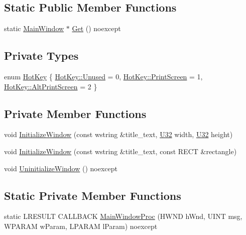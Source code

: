 \subsection*{Static Public Member Functions}
\begin{DoxyCompactItemize}
\item 
static \hyperlink{classmage_1_1_main_window}{Main\+Window} $\ast$ \hyperlink{classmage_1_1_main_window_ab670605775c88e0121afa7a52ac88ddf}{Get} () noexcept
\end{DoxyCompactItemize}
\subsection*{Private Types}
\begin{DoxyCompactItemize}
\item 
enum \hyperlink{classmage_1_1_main_window_a313cce567381c233d893d982e2e0fd74}{Hot\+Key} \{ \hyperlink{classmage_1_1_main_window_a313cce567381c233d893d982e2e0fd74a92e592d90b9548016776a6fb68dccded}{Hot\+Key\+::\+Unused} = 0, 
\hyperlink{classmage_1_1_main_window_a313cce567381c233d893d982e2e0fd74abf54024481cd2ad6bbb9ae44b7312472}{Hot\+Key\+::\+Print\+Screen} = 1, 
\hyperlink{classmage_1_1_main_window_a313cce567381c233d893d982e2e0fd74addd60da1bf3c7e63c80cef2dcecd4643}{Hot\+Key\+::\+Alt\+Print\+Screen} = 2
 \}
\end{DoxyCompactItemize}
\subsection*{Private Member Functions}
\begin{DoxyCompactItemize}
\item 
void \hyperlink{classmage_1_1_main_window_a5487a4a894e1fff7145f2d363a96ca0e}{Initialize\+Window} (const wstring \&title\+\_\+text, \hyperlink{namespacemage_a41c104c036fba3756a74e19f793eeaa1}{U32} width, \hyperlink{namespacemage_a41c104c036fba3756a74e19f793eeaa1}{U32} height)
\item 
void \hyperlink{classmage_1_1_main_window_ab87716ce916ba180068a65294fa037e8}{Initialize\+Window} (const wstring \&title\+\_\+text, const R\+E\+CT \&rectangle)
\item 
void \hyperlink{classmage_1_1_main_window_a229ff4bcc198ed9caf2ce54966caf746}{Uninitialize\+Window} () noexcept
\end{DoxyCompactItemize}
\subsection*{Static Private Member Functions}
\begin{DoxyCompactItemize}
\item 
static L\+R\+E\+S\+U\+LT C\+A\+L\+L\+B\+A\+CK \hyperlink{classmage_1_1_main_window_a66858afa3233e7c7fbf770fa01985b78}{Main\+Window\+Proc} (H\+W\+ND h\+Wnd, U\+I\+NT msg, W\+P\+A\+R\+AM w\+Param, L\+P\+A\+R\+AM l\+Param) noexcept
\end{DoxyCompactItemize}
